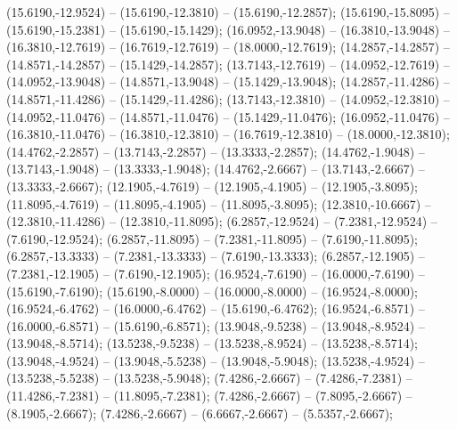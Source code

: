    (15.6190,-12.9524) -- (15.6190,-12.3810) -- (15.6190,-12.2857);
   (15.6190,-15.8095) -- (15.6190,-15.2381) -- (15.6190,-15.1429);
   (16.0952,-13.9048) -- (16.3810,-13.9048) -- (16.3810,-12.7619) -- (16.7619,-12.7619) -- (18.0000,-12.7619);
   (14.2857,-14.2857) -- (14.8571,-14.2857) -- (15.1429,-14.2857);
   (13.7143,-12.7619) -- (14.0952,-12.7619) -- (14.0952,-13.9048) -- (14.8571,-13.9048) -- (15.1429,-13.9048);
   (14.2857,-11.4286) -- (14.8571,-11.4286) -- (15.1429,-11.4286);
   (13.7143,-12.3810) -- (14.0952,-12.3810) -- (14.0952,-11.0476) -- (14.8571,-11.0476) -- (15.1429,-11.0476);
   (16.0952,-11.0476) -- (16.3810,-11.0476) -- (16.3810,-12.3810) -- (16.7619,-12.3810) -- (18.0000,-12.3810);
   (14.4762,-2.2857) -- (13.7143,-2.2857) -- (13.3333,-2.2857);
   (14.4762,-1.9048) -- (13.7143,-1.9048) -- (13.3333,-1.9048);
   (14.4762,-2.6667) -- (13.7143,-2.6667) -- (13.3333,-2.6667);
   (12.1905,-4.7619) -- (12.1905,-4.1905) -- (12.1905,-3.8095);
   (11.8095,-4.7619) -- (11.8095,-4.1905) -- (11.8095,-3.8095);
   (12.3810,-10.6667) -- (12.3810,-11.4286) -- (12.3810,-11.8095);
   (6.2857,-12.9524) -- (7.2381,-12.9524) -- (7.6190,-12.9524);
   (6.2857,-11.8095) -- (7.2381,-11.8095) -- (7.6190,-11.8095);
   (6.2857,-13.3333) -- (7.2381,-13.3333) -- (7.6190,-13.3333);
   (6.2857,-12.1905) -- (7.2381,-12.1905) -- (7.6190,-12.1905);
   (16.9524,-7.6190) -- (16.0000,-7.6190) -- (15.6190,-7.6190);
   (15.6190,-8.0000) -- (16.0000,-8.0000) -- (16.9524,-8.0000);
   (16.9524,-6.4762) -- (16.0000,-6.4762) -- (15.6190,-6.4762);
   (16.9524,-6.8571) -- (16.0000,-6.8571) -- (15.6190,-6.8571);
   (13.9048,-9.5238) -- (13.9048,-8.9524) -- (13.9048,-8.5714);
   (13.5238,-9.5238) -- (13.5238,-8.9524) -- (13.5238,-8.5714);
   (13.9048,-4.9524) -- (13.9048,-5.5238) -- (13.9048,-5.9048);
   (13.5238,-4.9524) -- (13.5238,-5.5238) -- (13.5238,-5.9048);
   (7.4286,-2.6667) -- (7.4286,-7.2381) -- (11.4286,-7.2381) -- (11.8095,-7.2381);
   (7.4286,-2.6667) -- (7.8095,-2.6667) -- (8.1905,-2.6667);
   (7.4286,-2.6667) -- (6.6667,-2.6667) -- (5.5357,-2.6667);
